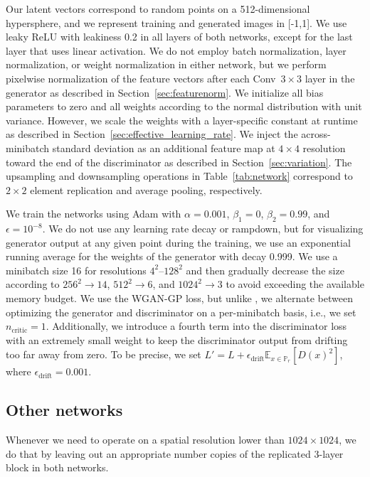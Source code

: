 \documentclass{article}
\begin{document}
Our latent vectors correspond to random points on a 512-dimensional hypersphere, and we represent training and generated images in [-1,1].
We use leaky ReLU with leakiness 0.2 in all layers of both networks, except for the last layer that uses linear activation.
We do not employ batch normalization, layer normalization, or weight normalization in either network, but we perform pixelwise normalization of the feature vectors after each Conv~$3\times3$ layer in the generator as described in Section~\ref{sec:featurenorm}.
We initialize all bias parameters to zero and all weights according to the normal distribution with unit variance.
However, we scale the weights with a layer-specific constant at runtime as described in Section~\ref{sec:effective_learning_rate}.
We inject the across-minibatch standard deviation as an additional feature map at $4\times4$ resolution toward the end of the discriminator as described in Section~\ref{sec:variation}.
The upsampling and downsampling operations in Table~\ref{tab:network} correspond to $2\times2$ element replication and average pooling, respectively.

We train the networks using Adam \citep{adam} with $\alpha=0.001$, $\beta_1=0$, $\beta_2=0.99$, and $\epsilon=10^{-8}$.
We do not use any learning rate decay or rampdown, but for visualizing generator output at any given point during the training, we use an exponential running average for the weights of the generator with decay 0.999.
We use a minibatch size 16 for resolutions $4^2$--$128^2$ and then gradually decrease the size according to $256^2\rightarrow14$, $512^2\rightarrow6$, and $1024^2\rightarrow3$ to avoid exceeding the available memory budget.
We use the WGAN-GP loss, but unlike \cite{Gulrajani2017}, we alternate between optimizing the generator and discriminator on a per-minibatch basis, i.e., we set $n_\mathrm{critic}=1$.
Additionally, we introduce a fourth term into the discriminator loss with an extremely small weight to keep the discriminator output from drifting too far away from zero.
To be precise, we set $L' = L + \epsilon_\mathrm{drift} \mathbb{E}_{x\in\mathbb{P}_r}[D(x)^2]$, where $\epsilon_\mathrm{drift}=0.001$.

 \subsection{Other networks}
\label{sec:network-reduced}

Whenever we need to operate on a spatial resolution lower than $1024\times1024$, we do that by leaving out an appropriate number copies of the replicated 3-layer block in both networks. %
\end{document}
